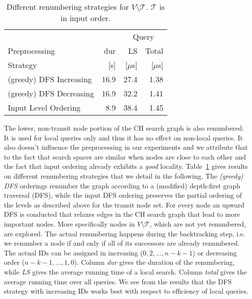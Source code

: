 \documentclass{llncs}
\begin{document}
\begin{table}[tb]
\caption{Different renumbering strategies for $V \setminus \mathcal{T} $. $\mathcal{T} $ is in input order.}
\label{tab:RenamingNonTransit}
\centering
\begin{tabular}{lrrr}
\toprule
 &	 & \multicolumn{2}{c}{Query} \\
 		\cmidrule(lr){2-2} \cmidrule(lr){3-4}
Preprocessing & dur & LS & Total\\
Strategy & [s] & [$\mu$s] & [$\mu$s]\\
\midrule
(greedy) DFS Increasing	& 16.9 	& 27.4 & 1.38 \\  
(greedy) DFS Decreasing	& 16.9 	& 32.2 & 1.41 \\ 
Input Level Ordering	& 8.9 & 38.4 & 1.45 \\ 
\bottomrule 
\end{tabular}
\end{table}

The lower, non-transit node portion of the CH search graph is also renumbered.
It is used for local queries only and thus it has no effect on non-local queries.
It also doesn't influence the preprocessing in our experiments and we attribute that to the fact that search spaces are similar when nodes are close to each other and the fact that input ordering already exhibits a \emph{good} locality.
Table~\ref{tab:RenamingNonTransit} gives results on different renumbering strategies that we detail in the following.
The \emph{(greedy) DFS} orderings renumber the graph according to a (modified) depth-first graph traversal (DFS), while the input DFS ordering preserves the partial ordering of the levels as described above for the transit node set.
For every node an upward DFS is conducted that relaxes edges in the CH search graph that lead to more important nodes.
More specifically nodes in $V \setminus \mathcal{T}$, which are not yet renumbered, are explored.
The actual renumbering happens during  the backtracking step, i.e. we renumber a node if and only if all of its successors are already renumbered. 
The actual IDs can be assigned in increasing ($0,2,\ldots,n-k-1$) or decreasing order ($n-k-1,\ldots,1,0$).
Column \emph{dur} gives the duration of the renumbering, while \emph{LS} gives the average running time of a local search.
Column \emph{total} gives the average running time over all queries.
We see from the results that the DFS strategy with increasing IDs works best with respect to efficiency of local queries.
\end{document}
